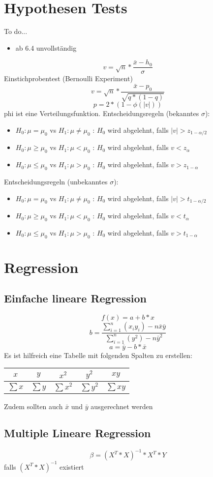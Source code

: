 \documentclass{article}
\begin{document}
	\section{Hypothesen Tests}
	To do...
	\begin{itemize}
		\item ab 6.4 unvollständig 
	\end{itemize}
	\[v=\sqrt{n}*\frac{\bar{x}-h_0}{\sigma}\]
	Einstichprobentest (Bernoulli Experiment)
	\[v=\sqrt{n}*\frac{\bar{x}-p_0}{\sqrt{q*(1-q)}}\]
	\linebreak 
	\[p=2*(1-\phi(|v|))\]
	phi ist eine Verteilungsfunktion.
	\linebreak
	Entscheidungsregeln (bekanntes $\sigma$):
	\begin{itemize}
		\item $H_0 : \mu = \mu_0$ vs $H_1 : \mu \ne \mu_0$ : $H_0$ wird abgelehnt, falls $|v| > z_{1-\alpha/2}$
		\item $H_0 : \mu \ge \mu_0$ vs $H_1 : \mu < \mu_0$ : $H_0$ wird abgelehnt, falls $v < z_{\alpha}$
		\item $H_0 : \mu \le \mu_0$ vs $H_1 : \mu > \mu_0$ : $H_0$ wird abgelehnt, falls $v > z_{1-\alpha}$
	\end{itemize}
	Entscheidungsregeln (unbekanntes $\sigma$):
	\begin{itemize}
		\item $H_0 : \mu = \mu_0$ vs $H_1 : \mu \ne \mu_0$ : $H_0$ wird abgelehnt, falls $|v| > t_{1-\alpha/2}$
		\item $H_0 : \mu \ge \mu_0$ vs $H_1 : \mu < \mu_0$ : $H_0$ wird abgelehnt, falls $v < t_{\alpha}$
		\item $H_0 : \mu \le \mu_0$ vs $H_1 : \mu > \mu_0$ : $H_0$ wird abgelehnt, falls $v > t_{1-\alpha}$
	\end{itemize}
	
	\section{Regression}
	\subsection{Einfache lineare Regression}
	\[f(x)=a+b*x\]
	\[b = \frac{\sum_{i=1}^{n}(x_i y_i)-n\bar{x}\bar{y}}{\sum_{i=1}^{n}(y^2)-n\bar{y}^2}\]
	\[a=\bar{y}-b*\bar{x}\]
	Es ist hilfreich eine Tabelle mit folgenden Spalten zu erstellen:
	\begin{center}
		\begin{tabular}{|| c c c c c ||}
			\hline
			$x$ & $y$ & $x^2$ & $y^2$ & $xy$ \\ 
			\hline
			\hline
			$\sum x$ & $\sum y$ & $\sum x^2$ & $\sum y^2$ & $\sum xy$ \\ \hline
			
		\end{tabular}
	\end{center}
	Zudem sollten auch $\bar{x}$ und $\bar{y}$ ausgerechnet werden
	
	\subsection{Multiple Lineare Regression}
	\[\beta = (X^T*X)^{-1}*X^T*Y\] falls $(X^T*X)^{-1}$ existiert
\end{document}
